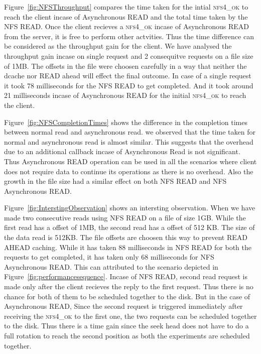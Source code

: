 Figure~\ref{fig:NFSThroughput} compares the  time taken for the intial \textsc{nfs4\_ok} to reach the client incase of Asynchronous READ and the total time taken by the NFS READ.
Once the client recieves a \textsc{nfs4\_ok}  incase of Asynchronous READ from the server, it is free to perform other actvities. Thus the time difference can be considered as the throughput gain for the client. We have analysed the throughput gain incase on single request and 2 consequitve requests on a file size of 1MB. The offsets in the file were choosen carefully in a way that neither the dcache nor READ ahead will effect the final outcome. In case of a single request it took 78 milliseconds for the NFS READ to get completed. And it took around 21 milliseconds incase of Asynchronous READ for the initial \textsc{nfs4\_ok}  to reach the client. 



	Figure~\ref{fig:NFSCompletionTimes} shows the  difference in the completion times between normal read and asynchronous read. we observed that the time taken for normal and asynchronous read is almost similar. This suggests that the overhead due to an additional callback incase of Asynchronous Read is not significant. Thus Asynchronous READ operation can be used in all the scenarios where client does not require data to continue its operations as there is no overhead. Also the growth in the file size had a similar effect on both NFS READ and NFS Asynchronous READ. 


 Figure~\ref{fig:InterstingObservation} shows an intersting observation. When we have made two consecutive reads  using NFS READ on a file of size 1GB. While the first read has a offset of 1MB, the second read has a offset of 512 KB. The size of the data read is 512KB. The file offsets are choosen this way to prevent READ AHEAD caching. While it has taken 88 milliseconds  in NFS READ for both the requests to get completed, it has taken only 68 milliseconds for NFS Asynchronous READ. This can attributed to the scenario depicted  in   Figure~\ref{fig:performancesequence}. Incase of NFS READ, second read request is made only after the client recieves the reply to the first request. Thus there is no chance for both of them to be scheduled together to the disk. But in the case of Asynchronous READ, Since the second request is triggered immediately after receiving the  \textsc{nfs4\_ok}  to the first one, the two requests can be scheduled together to the disk. Thus there is a time gain since the seek head does not have to do a full rotation to reach the second position as both the experiments are scheduled together.    


